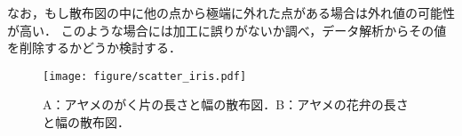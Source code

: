 %
なお，もし散布図の中に他の点から極端に外れた点がある場合は外れ値の可能性が高い．
%
このような場合には加工に誤りがないか調べ，データ解析からその値を削除するかどうか検討する．
%

%
\begin{figure}[H]
	\centering
	\texttt{[image: figure/scatter\_iris.pdf]}
	\caption{A：アヤメのがく片の長さと幅の散布図．B：アヤメの花弁の長さと幅の散布図．}
	\label{fig:scatter_iris}
\end{figure}
%

%

